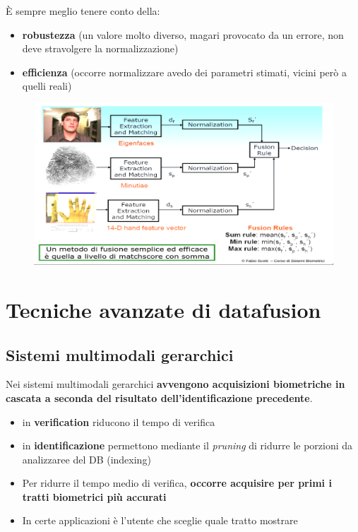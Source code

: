 \documentclass{report}
\begin{document}
\noindent È sempre meglio tenere conto della:
\begin{itemize}
    \item \textbf{robustezza} (un valore molto diverso, magari provocato da un errore, non 
    deve stravolgere la normalizzazione)
    \item \textbf{efficienza} (occorre normalizzare avedo dei parametri stimati, vicini però a quelli reali)
\end{itemize}

\begin{figure}[H]
    \centering
    \includegraphics[width=1\linewidth]{images/fusion.png}
\end{figure}




\chapter{Tecniche avanzate di datafusion}

\section{Sistemi multimodali gerarchici}
Nei sistemi multimodali gerarchici \textbf{avvengono acquisizioni biometriche
in cascata a seconda del risultato dell'identificazione precedente}.
\begin{itemize}
    \item in \textbf{verification} riducono il tempo di verifica 
    \item in \textbf{identificazione} permettono mediante il \textit{pruning} di 
    ridurre le porzioni da analizzaree del DB (indexing)
    \item Per ridurre il tempo medio di verifica, \textbf{occorre acquisire per primi i 
    tratti biometrici più accurati}
    \item In certe applicazioni è l'utente che sceglie quale tratto mostrare
\end{itemize}
\end{document}
